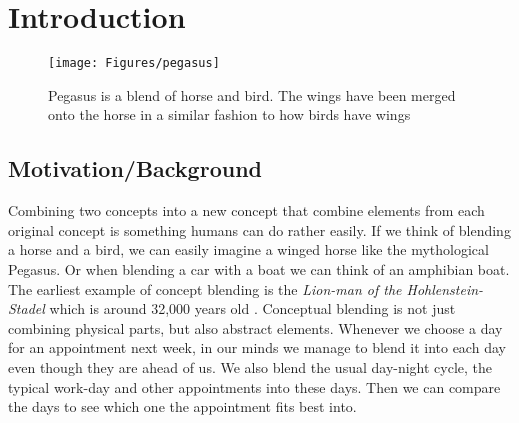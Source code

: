 
\chapter{Introduction} %

\label{Chapter1} %


\newcommand{\keyword}[1]{\textbf{#1}}
\newcommand{\tabhead}[1]{\textbf{#1}}
\newcommand{\code}[1]{\texttt{#1}}
\newcommand{\file}[1]{\texttt{\bfseries#1}}
\newcommand{\option}[1]{\texttt{\itshape#1}}


\begin{figure}
\centering
\texttt{[image: Figures/pegasus]}
\caption[Pegasus, a blend of horse and bird]{Pegasus is a blend of horse and bird. The wings have been merged onto the horse in a similar fashion to how birds have wings }
\label{fig:pegasus}
\end{figure}


\section{Motivation/Background}
Combining two concepts into a new concept that combine elements from each original concept is something humans can do rather easily.
If we think of blending a horse and a bird, we can easily imagine a winged horse like the mythological Pegasus.
Or when blending a car with a boat we can think of an amphibian boat.
The earliest example of concept blending is the \emph{Lion-man of the Hohlenstein-Stadel} which is around 32,000 years old \parencite{turner2014origin}.
Conceptual blending is not just combining physical parts, but also abstract elements.
Whenever we choose a day for an appointment next week, in our minds we manage to blend it into each day even though they are ahead of us.
We also blend the usual day-night cycle, the typical work-day and other appointments into these days.
Then we can compare the days to see which one the appointment fits best into. %

